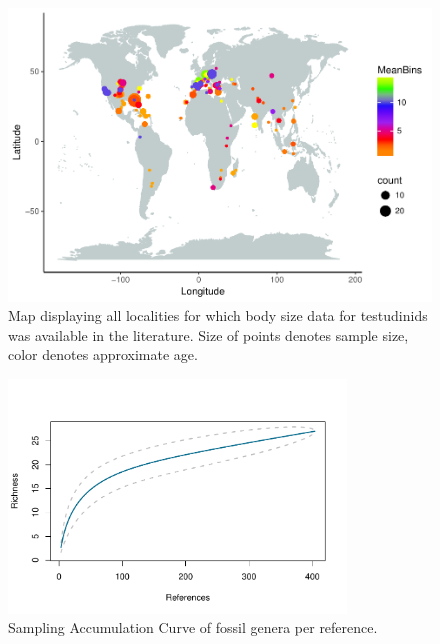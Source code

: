 \FloatBarrier

\begin{figure}[htbp]
	\centering
	\includegraphics[width=\textwidth]{MA_JJ_files/figure-latex/MapCL-1.pdf}
	\caption[Map: body size localities]{Map displaying all localities for which body size data for testudinids was available in the literature. Size of points denotes sample size, color denotes approximate age.}
\end{figure}



\FloatBarrier

\begin{figure}[htbp]
	\centering
	\includegraphics[width=0.8\textwidth]{MA_JJ_files/figure-latex/SACGenera-1.pdf}
	\caption[Sampling Accumulation Curve on generic level]{Sampling Accumulation Curve of fossil genera per reference.}
\end{figure}


